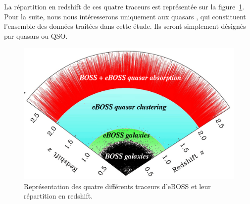 La répartition en redshift de ces quatre traceurs est représentée sur la figure~\ref{fig:eBOSStracers}.
Pour la suite, nous nous intéresserons uniquement aux quasars \lya{}, qui constituent l'ensemble des données traitées dans cette étude. Ils seront simplement désignés par quasars ou QSO.

\begin{figure}
  \centering
  \includegraphics[scale=0.5]{eBOSStracers}
  \caption{Représentation des quatre différents traceurs d'eBOSS et leur r\'epartition en redshift.}
  \label{fig:eBOSStracers}
\end{figure}
\paragraph{}





